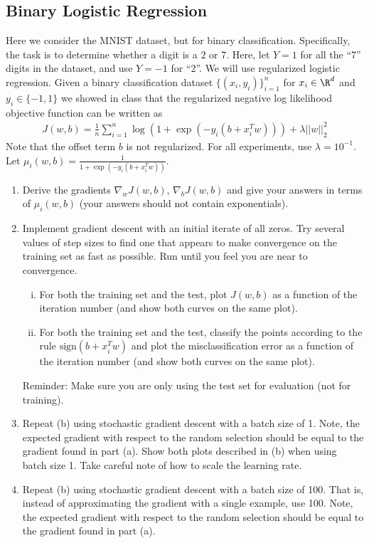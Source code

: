 \documentclass{article}
\begin{document}
\subsection*{Binary Logistic Regression}
\begin{aprob}
    Here we consider the MNIST dataset, but for binary classification. Specifically, the task is to determine whether a digit is a $2$ or $7$.
    Here, let $Y=1$ for all the ``7'' digits in the dataset, and use $Y=-1$ for ``2''.
    We will use regularized logistic regression.
    Given a binary classification dataset $\{(x_i,y_i)\}_{i=1}^n$ for $x_i \in \R^d$ and $y_i \in \{-1,1\}$ we showed in class that the regularized negative log likelihood objective function can be written as
    \begin{align*}
    J(w,b) = \frac{1}{n} \sum_{i=1}^n \log( 1 + \exp(-y_i (b + x_i^T w))) + \lambda ||w||_2^2
    \end{align*}
    Note that the offset term $b$ is not regularized.
    For all experiments, use $\lambda = 10^{-1}$.
    Let $\mu_i(w,b) = \frac{1}{1+ \exp(-y_i (b + x_i^T w))}$.
    \begin{enumerate}
        \item {} Derive the gradients $\nabla_w J(w,b)$, $\nabla_{b} J(w,b)$ and give your answers in terms of $\mu_i(w,b)$ (your answers should not contain exponentials).
        \item {} Implement gradient descent with an initial iterate of all zeros. Try several values of step sizes to find one that appears to make convergence on the training set as fast as possible. Run until you feel you are near to convergence.
        \begin{enumerate}[(i)]
            \item For both the training set and the test, plot $J(w,b)$ as a function of the iteration number (and show both curves on the same plot).
            \item For both the training set and the test, classify the points according to the rule $\text{sign}(b + x_i^T w)$ and plot the misclassification error as a function of the iteration number (and show both curves on the same plot).
        \end{enumerate}

        Reminder: Make sure you are only using the test set for evaluation (not for training).

        \item {} Repeat (b) using stochastic gradient descent with a batch size of 1. Note, the expected gradient with respect to the random selection should be equal to the gradient found in part (a). Show both plots described in (b) when using batch size 1. Take careful note of how to scale the learning rate.
        \item {} Repeat (b) using stochastic gradient descent with a batch size of 100. That is, instead of approximating the gradient with a single example, use 100. Note, the expected gradient with respect to the random selection should be equal to the gradient found in part (a).
    \end{enumerate}


\end{aprob}
\end{document}
